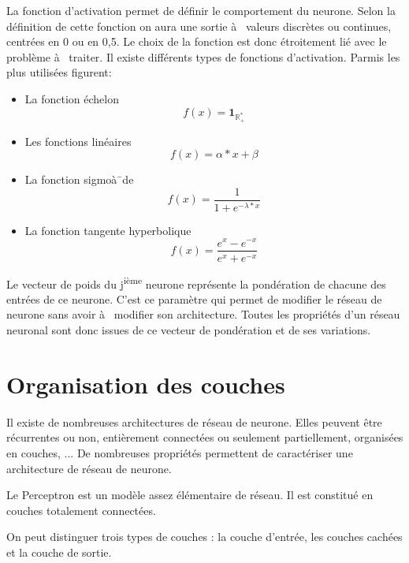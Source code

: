 \documentclass[a4paper,twoside]{report}
\begin{document}
La fonction d'activation permet de définir le comportement du neurone. Selon la définition de cette fonction on aura une sortie à  valeurs discrètes ou continues, centrées en 0 ou en 0,5. Le choix de la fonction est donc étroitement lié avec le problème à  traiter.
Il existe différents types de fonctions d'activation. Parmis les plus utilisées figurent:
\begin{itemize}
  \item La fonction échelon
  \begin{equation}
f(x)=\mathbf{1}_{\mathbb{R}^{*}_{+}}
\end{equation}
\item Les fonctions linéaires
\begin{equation}
f(x)=\alpha*x+\beta
\end{equation}
\item La fonction sigmoà¯de
\begin{equation}
f(x)=\frac{1}{1+e^{-\lambda*x}}
\end{equation}
\item La fonction tangente hyperbolique
\begin{equation}
f(x)=\frac{e^{x}-e^{-x}}{e^{x}+e^{-x}}
\end{equation}
\end{itemize}

Le vecteur de poids du j\textsuperscript{ième} neurone représente la pondération de chacune des entrées de ce neurone. C'est ce paramètre qui permet de modifier le réseau de neurone sans avoir à  modifier son architecture. Toutes les propriétés d'un réseau neuronal sont donc issues de ce vecteur de pondération et de ses variations.


\section{Organisation des couches}

Il existe de nombreuses architectures de réseau de neurone. Elles peuvent être récurrentes ou non, entièrement connectées ou seulement partiellement, organisées en couches, ... De nombreuses propriétés permettent de caractériser une architecture de réseau de neurone.

Le Perceptron est un modèle assez élémentaire de réseau. Il est constitué en couches totalement connectées.

On peut distinguer trois types de couches : la couche d'entrée, les couches cachées et la couche de sortie.\\
\end{document}
